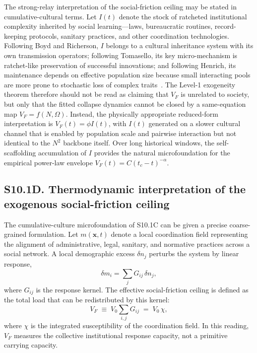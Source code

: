 \documentclass[11pt]{article}
\begin{document}
The strong-relay interpretation of the social-friction ceiling may be stated in
cumulative-cultural terms.
Let $I(t)$ denote the stock of ratcheted institutional complexity inherited by social
learning---laws, bureaucratic routines, record-keeping protocols, sanitary practices, and
other coordination technologies.
Following Boyd and Richerson, $I$ belongs to a cultural inheritance system with its own
transmission operators; following Tomasello, its key micro-mechanism is ratchet-like
preservation of successful innovations; and following Henrich, its maintenance depends on
effective population size because small interacting pools are more prone to stochastic loss
of complex traits~\cite{boydricherson1985,tomasello1999,henrich2004,richerson2005}.
The Level-1 exogeneity theorem therefore should not be read as claiming that $V_F$ is
unrelated to society, but only that the fitted collapse dynamics cannot be closed by a
same-equation map $V_F=f(N,\Omega)$.
Instead, the physically appropriate reduced-form interpretation is $V_F(t)=\phi I(t)$,
with $I(t)$ generated on a slower cultural channel that is enabled by population scale and
pairwise interaction but not identical to the $N^2$ backbone itself.
Over long historical windows, the self-scaffolding accumulation of $I$ provides the natural
microfoundation for the empirical power-law envelope $V_F(t)=C(t_c-t)^{-\alpha}$.

\subsection*{S10.1D. Thermodynamic interpretation of the exogenous social-friction ceiling}

The cumulative-culture microfoundation of S10.1C can be given a precise
coarse-grained formulation.  Let $m(\mathbf{x},t)$ denote a local
coordination field representing the alignment of administrative, legal,
sanitary, and normative practices across a social network.  A local
demographic excess $\delta n_j$ perturbs the system by linear response,
\begin{equation}
  \delta m_i = \sum_j G_{ij}\,\delta n_j,
\end{equation}
where $G_{ij}$ is the response kernel.  The effective social-friction ceiling
is defined as the total load that can be redistributed by this kernel:
\begin{equation}
  V_F \;\equiv\; V_0 \sum_{i,j} G_{ij} \;=\; V_0\,\chi,
  \label{eq:VF_susceptibility}
\end{equation}
where $\chi$ is the integrated susceptibility of the coordination field.
In this reading, $V_F$ measures the collective institutional response capacity,
not a primitive carrying capacity.
\end{document}
